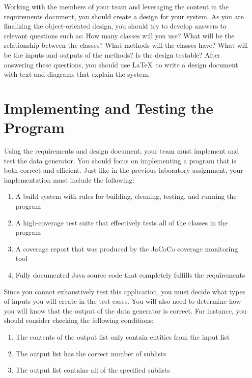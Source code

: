Working with the members of your team and leveraging the content in the requirements document, you should create a
design for your system.  As you are finalizing the object-oriented design, you should try to develop answers to relevant
questions such as: How many classes will you use? What will be the relationship between the classes? What methods will
the classes have? What will be the inputs and outputs of the methods?  Is the design testable?  After answering these
questions, you should use \LaTeX\  to write a design document with text and diagrams that explain the system.

\section*{Implementing and Testing the Program}

Using the requirements and design document, your team must implement and test the data generator. You should focus on
implementing a program that is both correct and efficient. Just like in the previous laboratory assignment, your
implementation must include the following:

\begin{enumerate}
	\item A build system with rules for building, cleaning, testing, and running the program
	\item A high-coverage test suite that effectively tests all of the classes in the program
	\item A coverage report that was produced by the JaCoCo coverage monitoring tool
	\item Fully documented Java source code that completely fulfills the requirements
\end{enumerate}

Since you cannot exhaustively test this application, you must decide what types of inputs you will create in the test
cases.  You will also need to determine how you will know that the output of the data generator is correct.  For
instance, you should consider checking the following conditions:

\begin{enumerate}
	\item The contents of the output list only contain entities from the input list
	\item The output list has the correct number of sublists
	\item The output list contains all of the specified sublists
\end{enumerate}

